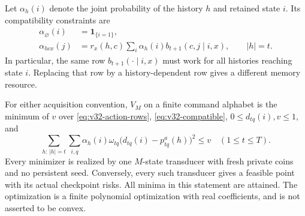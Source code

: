 Let $\alpha_h(i)$ denote the joint probability of the history $h$ and
retained state $i$. Its compatibility constraints are
\begin{equation}\label{eq:v32-compatible}
 \begin{split}
 \alpha_{\varnothing}(i)&=\mathbf1_{\{i=1\}},\\
 \alpha_{hcx}(j)&=r_x(h,c)
              \sum_i\alpha_h(i)b_{t+1}(c,j\mid i,x),\qquad |h|=t.
 \end{split}
\end{equation}
In particular, the same row $b_{t+1}(\cdot\mid i,x)$ must work for all
histories reaching state $i$. Replacing that row by a history-dependent
row gives a different memory resource.

\begin{theorem}\label{thm:v32-finite}
For either acquisition convention, $V_M$ on a finite command alphabet is
the minimum of $v$ over \eqref{eq:v32-action-rows},
\eqref{eq:v32-compatible}, $0\le d_{tq}(i),v\le1$, and
\begin{equation}\label{eq:v32-finite-program}
 \sum_{h:\,|h|=t}\sum_{i,q}\alpha_h(i)\omega_{tq}
       \bigl(d_{tq}(i)-p^a_{tq}(h)\bigr)^2\le v
                   \quad(1\le t\le T).
\end{equation}
Every minimizer is realized by one $M$-state transducer with fresh private
coins and no persistent seed. Conversely, every such transducer gives a
feasible point with its actual checkpoint risks. All minima in this
statement are attained. The optimization is a finite polynomial
optimization with real coefficients, and is not asserted to be convex.
\end{theorem}

